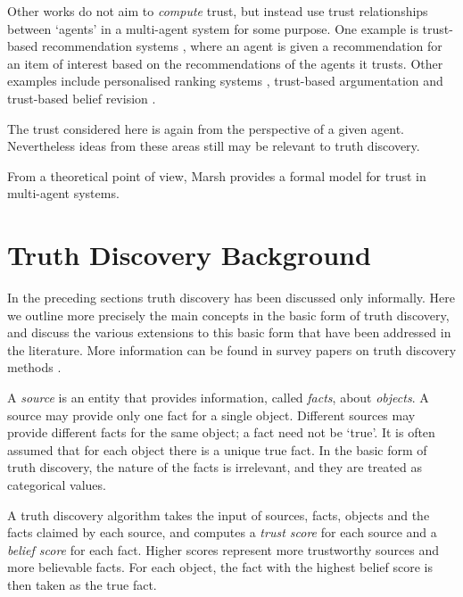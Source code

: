 \documentclass[../main.tex]{subfiles}
\begin{document}
Other works do not aim to \emph{compute} trust, but instead use trust
relationships between `agents' in a multi-agent system for some purpose. One
example is trust-based recommendation systems \cite{andersen}, where an agent
is given a recommendation for an item of interest based on the recommendations
of the agents it trusts. Other examples include personalised ranking systems
\cite{altman_personalised}, trust-based argumentation \cite{tang} and
trust-based belief revision \cite{booth}.

The trust considered here is again from the perspective of a given agent.
Nevertheless ideas from these areas still may be relevant to truth discovery.

From a theoretical point of view, Marsh \cite{marsh} provides a formal model
for trust in multi-agent systems.

\section{Truth Discovery Background}

In the preceding sections truth discovery has been discussed only informally.
Here we outline more precisely the main concepts in the basic form of truth
discovery, and discuss the various extensions to this basic form that have been
addressed in the literature. More information can be found in survey papers on
truth discovery methods \cite{li_survey, gupta_han_survey}.

A \emph{source} is an entity that provides information, called \emph{facts},
about \emph{objects}. A source may provide only one fact for a single object.
Different sources may provide different facts for the same object; a fact need
not be `true'. It is often assumed that for each object there is a unique true
fact. In the basic form of truth discovery, the nature of the facts is
irrelevant, and they are treated as categorical values\footnotemark.


A truth discovery algorithm takes the input of sources, facts, objects and the
facts claimed by each source, and computes a \emph{trust score} for each source
and a \emph{belief score} for each fact. Higher scores represent more
trustworthy sources and more believable facts\footnotemark. For each object,
the fact with the highest belief score is then taken as the true fact.
\end{document}
